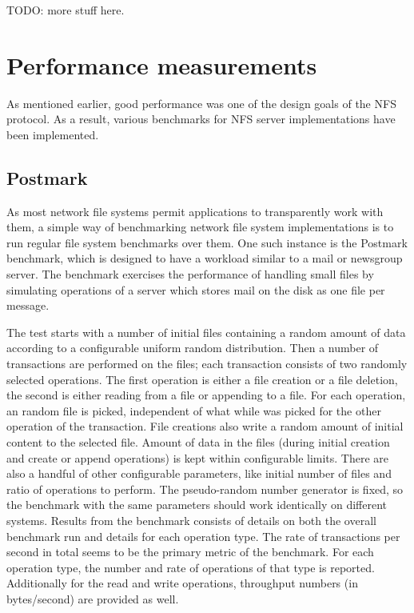 TODO: more stuff here.

\section{Performance measurements} \label{sect:PerfMeasurements}

As mentioned earlier, good performance was one of the design goals of the NFS protocol.
As a result, various benchmarks for NFS server implementations have been implemented.

\subsection{Postmark}
As most network file systems permit applications to transparently work with them,
a simple way of benchmarking network file system implementations is to run regular file system benchmarks over them.
One such instance is the Postmark benchmark, which is designed to have a workload similar to a mail or newsgroup server.
The benchmark exercises the performance of handling small files by simulating operations of a server which
stores mail on the disk as one file per message.

The test starts with a number of initial files containing a random amount of data according to a configurable uniform random distribution.
Then a number of transactions are performed on the files; each transaction consists of two randomly selected operations.
The first operation is either a file creation or a file deletion, the second is either reading from a file or appending to a file.
For each operation, an random file is picked, independent of what while was picked for the other operation of the transaction.
File creations also write a random amount of initial content to the selected file.
Amount of data in the files (during initial creation and create or append operations) is kept within configurable limits.
There are also a handful of other configurable parameters, like initial number of files and ratio of operations to perform.
The pseudo-random number generator is fixed, so the benchmark with the same parameters should work identically on different systems.
Results from the benchmark consists of details on both the overall benchmark run and details for each operation type.
The rate of transactions per second in total seems to be the primary metric of the benchmark.
For each operation type, the number and rate of operations of that type is reported.
Additionally for the read and write operations, throughput numbers (in bytes/second) are provided as well.

